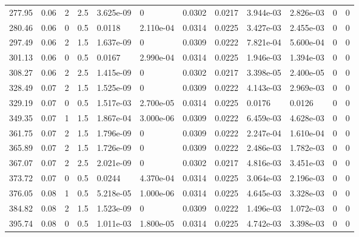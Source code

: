 \documentclass[preview]{standalone}
\begin{document}
{{\begin{tabular}{L{1.2cm}C{1.2cm} C{0.3cm}C{0.5cm} C{1.4cm}C{1.4cm} C{1.4cm}C{1.4cm} C{1.6cm}C{1.6cm} C{1.6cm}C{1.6cm}}
  277.95  &  0.06  & 2     & 2.5 &  3.625e-09  & 0  &  0.0302&   0.0217& 3.944e-03 & 2.826e-03   &  0 & 0  \\ 
  280.46  &  0.06  & 0     & 0.5 &  0.0118  & 2.110e-04  &  0.0314&   0.0225& 3.427e-03 & 2.455e-03   &  0 & 0  \\ 
  297.49  &  0.06  & 2     & 1.5 &  1.637e-09  & 0  &  0.0309&   0.0222& 7.821e-04 & 5.600e-04   &  0 & 0  \\ 
  301.13  &  0.06  & 0     & 0.5 &  0.0167  & 2.990e-04  &  0.0314&   0.0225& 1.946e-03 & 1.394e-03   &  0 & 0  \\ 
  308.27  &  0.06  & 2     & 2.5 &  1.415e-09  & 0  &  0.0302&   0.0217& 3.398e-05 & 2.400e-05   &  0 & 0  \\ 
  328.49  &  0.07  & 2     & 1.5 &  1.525e-09  & 0  &  0.0309&   0.0222& 4.143e-03 & 2.969e-03   &  0 & 0  \\ 
  329.19  &  0.07  & 0     & 0.5 &  1.517e-03  & 2.700e-05  &  0.0314&   0.0225& 0.0176 & 0.0126   &  0 & 0  \\ 
  349.35  &  0.07  & 1     & 1.5 &  1.867e-04  & 3.000e-06  &  0.0309&   0.0222& 6.459e-03 & 4.628e-03   &  0 & 0  \\ 
  361.75  &  0.07  & 2     & 1.5 &  1.796e-09  & 0  &  0.0309&   0.0222& 2.247e-04 & 1.610e-04   &  0 & 0  \\ 
  365.89  &  0.07  & 2     & 1.5 &  1.726e-09  & 0  &  0.0309&   0.0222& 2.486e-03 & 1.782e-03   &  0 & 0  \\ 
  367.07  &  0.07  & 2     & 2.5 &  2.021e-09  & 0  &  0.0302&   0.0217& 4.816e-03 & 3.451e-03   &  0 & 0  \\ 
  373.72  &  0.07  & 0     & 0.5 &  0.0244  & 4.370e-04  &  0.0314&   0.0225& 3.064e-03 & 2.196e-03   &  0 & 0  \\ 
  376.05  &  0.08  & 1     & 0.5 &  5.218e-05  & 1.000e-06  &  0.0314&   0.0225& 4.645e-03 & 3.328e-03   &  0 & 0  \\ 
  384.82  &  0.08  & 2     & 1.5 &  1.523e-09  & 0  &  0.0309&   0.0222& 1.496e-03 & 1.072e-03   &  0 & 0  \\ 
  395.74  &  0.08  & 0     & 0.5 &  1.011e-03  & 1.800e-05  &  0.0314&   0.0225& 4.742e-03 & 3.398e-03   &  0 & 0  \\ 
\hline 
\end{tabular} 

}}
\end{document}
